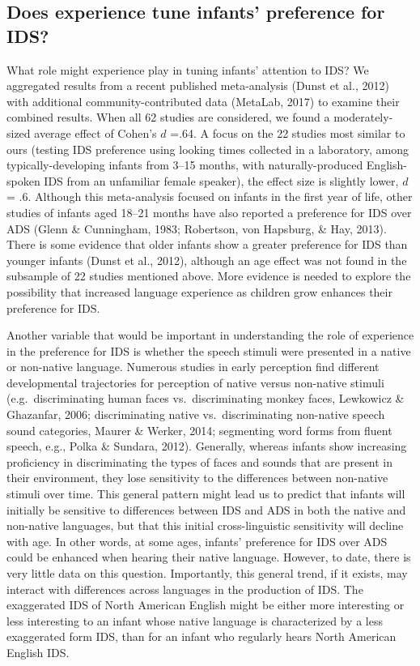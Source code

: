 \documentclass[english,,man,floatsintext]{apa6}
\begin{document}
\hypertarget{does-experience-tune-infants-preference-for-ids}{%
\subsection{Does experience tune infants' preference for IDS?}\label{does-experience-tune-infants-preference-for-ids}}

What role might experience play in tuning infants' attention to IDS? We aggregated results from a recent published meta-analysis (Dunst et al., 2012) with additional community-contributed data (MetaLab, 2017) to examine their combined results. When all 62 studies are considered, we found a moderately-sized average effect of Cohen's \(d\) =.64. A focus on the 22 studies most similar to ours (testing IDS preference using looking times collected in a laboratory, among typically-developing infants from 3--15 months, with naturally-produced English-spoken IDS from an unfamiliar female speaker), the effect size is slightly lower, \(d\) = .6. Although this meta-analysis focused on infants in the first year of life, other studies of infants aged 18--21 months have also reported a preference for IDS over ADS (Glenn \& Cunningham, 1983; Robertson, von Hapsburg, \& Hay, 2013). There is some evidence that older infants show a greater preference for IDS than younger infants (Dunst et al., 2012), although an age effect was not found in the subsample of 22 studies mentioned above. More evidence is needed to explore the possibility that increased language experience as children grow enhances their preference for IDS.

Another variable that would be important in understanding the role of experience in the preference for IDS is whether the speech stimuli were presented in a native or non-native language. Numerous studies in early perception find different developmental trajectories for perception of native versus non-native stimuli (e.g.~discriminating human faces vs.~discriminating monkey faces, Lewkowicz \& Ghazanfar, 2006; discriminating native vs.~discriminating non-native speech sound categories, Maurer \& Werker, 2014; segmenting word forms from fluent speech, e.g., Polka \& Sundara, 2012). Generally, whereas infants show increasing proficiency in discriminating the types of faces and sounds that are present in their environment, they lose sensitivity to the differences between non-native stimuli over time. This general pattern might lead us to predict that infants will initially be sensitive to differences between IDS and ADS in both the native and non-native languages, but that this initial cross-linguistic sensitivity will decline with age. In other words, at some ages, infants' preference for IDS over ADS could be enhanced when hearing their native language. However, to date, there is very little data on this question. Importantly, this general trend, if it exists, may interact with differences across languages in the production of IDS. The exaggerated IDS of North American English might be either more interesting or less interesting to an infant whose native language is characterized by a less exaggerated form IDS, than for an infant who regularly hears North American English IDS.
\end{document}
